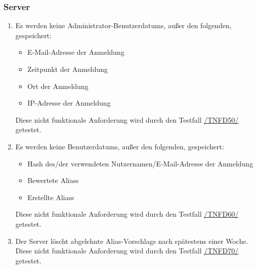 \subsubsection*{Server}

\begin{samepage}
    \begin{enumerate}[label=\textbf{/NFD\arabic*0/}, align=left, start=5]
        \item \label{/NFD50/} Es werden keine \Gls{Administrator}-\Glspl{Benutzerdatum}, außer den folgenden, gespeichert:
            \begin{itemize}
                \item E-Mail-Adresse der Anmeldung
                \item Zeitpunkt der Anmeldung
                \item Ort der Anmeldung
                \item \Gls{IP-Adresse} der Anmeldung
            \end{itemize}
            Diese nicht funktionale Anforderung wird durch den Testfall \hyperref[/TNFD50/]{/TNFD50/} getestet.
        \item \label{/NFD60/} Es werden keine \Glspl{Benutzerdatum}, außer den folgenden, gespeichert:
            \begin{itemize}
                \item \Gls{Hash} des/der verwendeten Nutzernamen/E-Mail-Adresse der Anmeldung
                \item Bewertete \Glspl{Alias} 
                \item Erstellte \Glspl{Alias} 
            \end{itemize}
            Diese nicht funktionale Anforderung wird durch den Testfall \hyperref[/TNFD60/]{/TNFD60/} getestet.
        \item \label{/NFD70/} Der \Gls{Server} löscht abgelehnte \Glspl{Alias-Vorschlag} nach spätestens einer Woche. Diese nicht funktionale Anforderung wird durch den Testfall \hyperref[/TNFD70/]{/TNFD70/} getestet.
    \end{enumerate}
\end{samepage}
